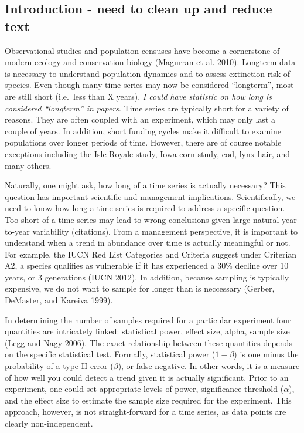 \documentclass[12pt,]{article}
\begin{document}
\subsection{Introduction - need to clean up and reduce
text}\label{introduction---need-to-clean-up-and-reduce-text}

Observational studies and population censuses have become a cornerstone
of modern ecology and conservation biology (Magurran et al. 2010).
Longterm data is necessary to understand population dynamics and to
assess extinction risk of species. Even though many time series may now
be considered ``longterm'', most are still short (i.e.~less than X
years). \emph{I could have statistic on how long is considered
``longterm'' in papers}. Time series are typically short for a variety
of reasons. They are often coupled with an experiment, which may only
last a couple of years. In addition, short funding cycles make it
difficult to examine populations over longer periods of time. However,
there are of course notable exceptions including the Isle Royale study,
Iowa corn study, cod, lynx-hair, and many others.

Naturally, one might ask, how long of a time series is actually
necessary? This question has important scientific and management
implications. Scientifically, we need to know how long a time series is
required to address a specific question. Too short of a time series may
lead to wrong conclusions given large natural year-to-year variability
(citations). From a management perspective, it is important to
understand when a trend in abundance over time is actually meaningful or
not. For example, the IUCN Red List Categories and Criteria suggest
under Criterian A2, a species qualifies as vulnerable if it has
experienced a 30\% decline over 10 years, or 3 generations (IUCN 2012).
In addition, because sampling is typically expensive, we do not want to
sample for longer than is neccessary (Gerber, DeMaster, and Kareiva
1999).

In determining the number of samples required for a particular
experiment four quantities are intricately linked: statistical power,
effect size, alpha, sample size (Legg and Nagy 2006). The exact
relationship between these quantities depends on the specific
statistical test. Formally, statistical power (\(1-\beta\)) is one minus
the probability of a type II error (\(\beta\)), or false negative. In
other words, it is a measure of how well you could detect a trend given
it is actually significant. Prior to an experiment, one could set
appropriate levels of power, significance threshold (\(\alpha\)), and
the effect size to estimate the sample size required for the experiment.
This approach, however, is not straight-forward for a time series, as
data points are clearly non-independent.
\end{document}
